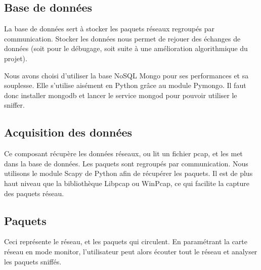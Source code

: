 \subsection{Base de données}
La base de données sert à stocker les paquets réseaux regroupés par communication. Stocker les données nous permet de rejouer des échanges de données (soit pour le débugage, soit suite à une amélioration algorithmique du projet).	

Nous avons choisi d'utiliser la base NoSQL Mongo pour ses performances et sa souplesse. Elle s'utilise aisément en Python grâce au module Pymongo. Il faut donc installer mongodb et lancer le service mongod pour pouvoir utiliser le sniffer.

\subsection{Acquisition des données}
Ce composant récupère les données réseaux, ou lit un fichier pcap, et les met dans la base de données. Les paquets sont regroupés par communication.
Nous utilisons le module Scapy de Python afin de récupérer les paquets. Il est de plus haut niveau que la bibliothèque Libpcap ou WinPcap, ce qui facilite la capture des paquets réseau. 

\subsection{Paquets}
Ceci représente le réseau, et les paquets qui circulent. En paramétrant la carte réseau en mode monitor, l'utilisateur peut alors écouter tout le réseau et analyser les paquets sniffés.


